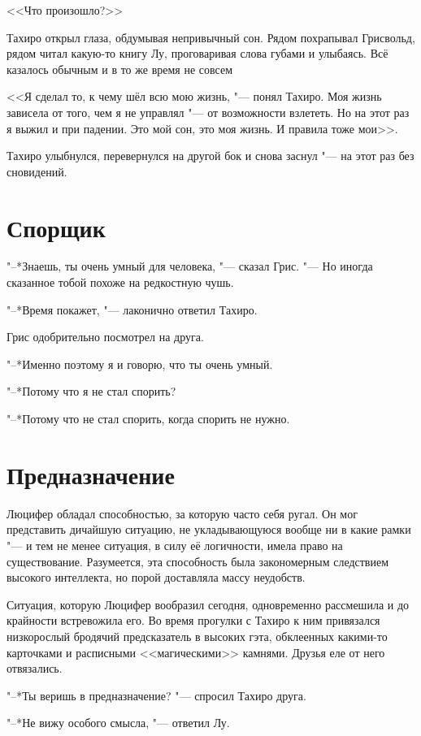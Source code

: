 <<Что произошло?>>

Тахиро открыл глаза, обдумывая непривычный сон.
Рядом похрапывал Грисвольд, рядом читал какую-то книгу Лу, проговаривая слова губами и улыбаясь.
Всё казалось обычным и в то же время не совсем\ldotst

<<Я сделал то, к чему шёл всю мою жизнь, "--- понял Тахиро.
Моя жизнь зависела от того, чем я не управлял "--- от возможности взлететь.
Но на этот раз я выжил и при падении.
Это мой сон, это моя жизнь.
И правила тоже мои>>.

Тахиро улыбнулся, перевернулся на другой бок и снова заснул "--- на этот раз без сновидений.

\section{Спорщик}

"--*Знаешь, ты очень умный для человека, "--- сказал Грис.
"--- Но иногда сказанное тобой похоже на редкостную чушь.

"--*Время покажет, "--- лаконично ответил Тахиро.

Грис одобрительно посмотрел на друга.

"--*Именно поэтому я и говорю, что ты очень умный.

"--*Потому что я не стал спорить?

"--*Потому что не стал спорить, когда спорить не нужно.

\section{Предназначение}

Люцифер обладал способностью, за которую часто себя ругал.
Он мог представить дичайшую ситуацию, не укладывающуюся вообще ни в какие рамки "--- и тем не менее ситуация, в силу её логичности, имела право на существование.
Разумеется, эта способность была закономерным следствием высокого интеллекта, но порой доставляла массу неудобств.

Ситуация, которую Люцифер вообразил сегодня, одновременно рассмешила и до крайности встревожила его.
Во время прогулки с Тахиро к ним привязался низкорослый бродячий предсказатель в высоких гэта, обклеенных какими-то карточками и расписными <<магическими>> камнями.
Друзья еле от него отвязались.

"--*Ты веришь в предназначение? "--- спросил Тахиро друга.

"--*Не вижу особого смысла, "--- ответил Лу.

